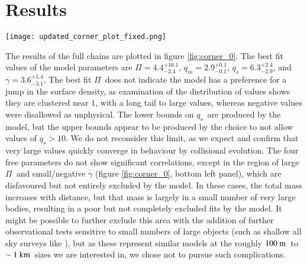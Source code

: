 \documentclass[printer]{aa}
\newcommand{\revised}{\color{black}}
\begin{document}
\section{Results}

\label{sec:results}

\begin{figure*}
   \texttt{[image: updated\_corner\_plot\_fixed.png]}
  \caption{A corner plot of the results of the MCMC search of the viable parameter space.  The contour plots show the correlations between parameters, the histograms the one parameter distribution within the model evaluation.  The best fit values of the model parameters are $\Pi = 4.4^{+16.1}_{-2.4}$, $q_m = 2.9^{+0.1}_{-0.1}$, $q_s = 6.3^{+2.4}_{-2.9}$, and $\gamma = 3.6^{+1.4}_{-3.1}$, where $q_s$~can probably be increased to arbitrarily large values and remain a good fit.  $q_m$ is strongly constrained, while the other parameters have significant areas of lower fit quality that are not strongly excluded.}
  \label{fig:corner_0}
\end{figure*}

The results of the full chains are plotted in figure \ref{fig:corner_0}.  The best fit values of the model parameters are $\Pi = 4.4^{+16.1}_{-2.4}$, $q_m = 2.9^{+0.1}_{-0.1}$, $q_s = 6.3^{+2.4}_{-2.9}$, and $\gamma = 3.6^{+1.4}_{-3.1}$.  The best fit $\Pi$~does not indicate the model has a preference for a jump in the surface density, as examination of the distribution of values shows they are clustered near $1$, with a long tail to large values, whereas negative values were disallowed as unphysical.  The lower bounds on $q_s$~are produced by the model, but the upper bounds appear to be produced by the choice to not allow values of $q_s > 10$.  We do not reconsider this limit, as we expect and confirm that very large values quickly converge in behaviour by collisional evolution.  The four free parameters do not show significant correlations, except in the region of large $\Pi$~and small/negative $\gamma$ (figure \ref{fig:corner_0}, bottom left panel), which are disfavoured but not entirely excluded by the model.  In these cases, the total mass increases with distance, but that mass is largely in a small number of very large bodies, resulting in a poor but not completely excluded fits by the model.  It might be possible to further exclude this area with the addition of further observational tests sensitive to small numbers of large objects (such as shallow all sky surveys like \citet{2015AJ....149...69B}), but as these represent similar models at the {\revised roughly} $100~\rm{m}$~{\revised to} $\sim 1~\rm{km}$~sizes we are interested in, we chose not to pursue such complications.
\end{document}
